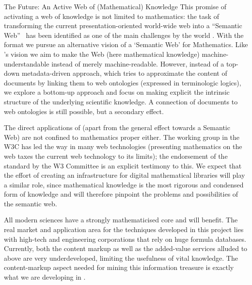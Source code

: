 \begin{omgroup}[id=omdoc-markup,short=Open Mathematical Documents]
\begin{omgroup}[id=mathweb]{The Future: An Active Web of (Mathematical) Knowledge}
This promise of activating a web of knowledge is not limited to mathematics: the task of
transforming the current presentation-oriented world-wide web into a ``Semantic
Web''~\cite{BernersLee:tsw98} has been identified as one of the main challenges by the
world {}. With the {\omdoc} format we pursue an alternative vision of a
`Semantic Web' for Mathematics. Like {}'s vision we aim to make
the Web (here mathematical knowledge) machine-understandable instead of merely
machine-readable. However, instead of a top-down metadata-driven approach, which tries to
approximate the content of documents by linking them to web ontologies (expressed in
terminologic logics), we explore a bottom-up approach and focus on making explicit the
intrinsic structure of the underlying scientific knowledge. A connection of documents to
web ontologies is still possible, but a secondary effect.

The direct applications of {\omdoc} (apart from the general effect towards a Semantic Web)
are not confined to mathematics proper either.  The {\mathml} working group in the W3C has
led the way in many web technologies (presenting mathematics on the web taxes the current
web technology to its limits); the endorsement of the {\mathml} standard by the W3
Committee is an explicit testimony to this. We expect that the effort of creating an
infrastructure for digital mathematical libraries will play a similar role, since
mathematical knowledge is the most rigorous and condensed form of knowledge and will
therefore pinpoint the problems and possibilities of the semantic web.

All modern sciences have a strongly mathematicised core and will benefit. The real market
and application area for the techniques developed in this project lies with high-tech and
engineering corporations that rely on huge formula databases.  Currently, both the content
markup as well as the added-value services alluded to above are very underdeveloped,
limiting the usefulness of vital knowledge. The content-markup aspect needed for mining
this information treasure is exactly what we are developing in {\omdoc}.
\end{omgroup}
\end{omgroup}


